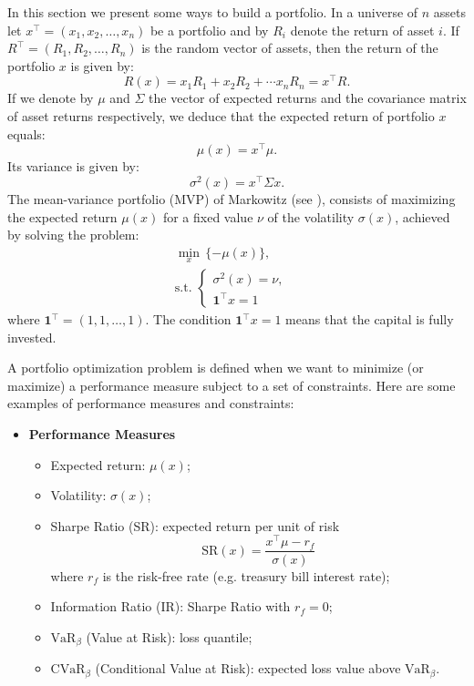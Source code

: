 In this section we present some ways to build a portfolio. In a universe of $n$ assets let $x^\top = (x_1, x_2, \dots, x_n)$ be a portfolio and by $R_i$ denote the return of asset $i$. If $R^\top=(R_1, R_2, \dots, R_n)$  is the random vector of assets, then the return of the portfolio $x$ is given by:
\[
	R(x) = x_1R_1+x_2R_2+\cdots x_nR_n = x^\top R.
\]
If we denote by $\mu$ and $\Sigma$ the vector of expected returns and the covariance matrix of asset returns respectively, we deduce that the expected return of portfolio $x$ equals:
\[
	\mu(x) = x^\top \mu.
\]
Its variance is given by:
\[
	\sigma^2(x) = x^\top \Sigma x.
\]
The mean-variance portfolio (MVP) of Markowitz (see \cite{Markowitz1952}), consists of maximizing the expected return $\mu(x)$ for a fixed value $\nu$ of the volatility $\sigma(x)$, achieved by solving the problem:
\begin{eqnarray}\label{prob:MVP}
	\min_{x} \, \{- \mu(x)\}, \\
	\mbox{s.t. }\left\{
	\begin{aligned}\nonumber
		\sigma^2(x) = \nu,  & \\
		\mathbf{1}^\top x=1 &
	\end{aligned}
	\right.
\end{eqnarray}
where $\textbf{1}^\top =(1,1,\dots,1)$. The condition $\mathbf{1}^\top x=1$ means that the capital is fully invested.

A portfolio optimization  problem is defined when we want to minimize (or maximize) a performance measure subject to a set of constraints. Here are some examples of performance measures and constraints:

\begin{itemize}
	\item \textbf{Performance Measures}
	      \begin{itemize}
		      \item Expected return: $\mu(x)$;
		      \item Volatility: $\sigma(x)$;
		      \item Sharpe Ratio (SR): expected return per unit of risk
		            \[
			            \mbox{SR}(x) = \frac{x^\top \mu - r_f}{\sigma(x)}
		            \]
		            where $r_f$ is the risk-free rate (e.g. treasury bill interest rate);
		      \item Information Ratio (IR): Sharpe Ratio with $r_f=0$;
		      \item $\mbox{VaR}_\beta$ (Value at Risk): loss quantile;
		      \item $\mbox{CVaR}_\beta$ (Conditional Value at Risk): expected loss value above $\mbox{VaR}_\beta$.
	      \end{itemize}
\end{itemize}

